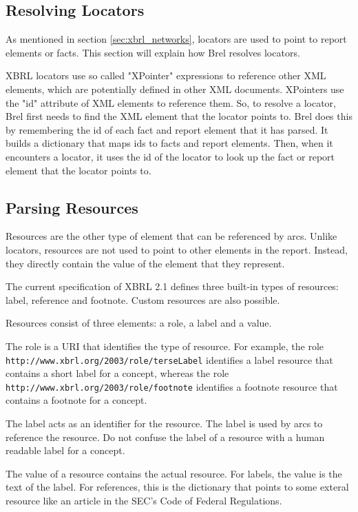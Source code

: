 \subsection{Resolving Locators}

As mentioned in section \ref{sec:xbrl_networks}, locators are used to point to report elements or facts.
This section will explain how Brel resolves locators.

XBRL locators use so called "XPointer" expressions to reference other XML elements, which are potentially defined in other XML documents.\cite{w3_xpointer}
XPointers use the "id" attribute of XML elements to reference them.
So, to resolve a locator, Brel first needs to find the XML element that the locator points to.
Brel does this by remembering the id of each fact and report element that it has parsed.
It builds a dictionary that maps ids to facts and report elements.
Then, when it encounters a locator, it uses the id of the locator to look up the fact or report element that the locator points to.

\subsection{Parsing Resources}

Resources are the other type of element that can be referenced by arcs.
Unlike locators, resources are not used to point to other elements in the report.
Instead, they directly contain the value of the element that they represent.

The current specification of XBRL 2.1 defines three built-in types of resources: label, reference and footnote.
Custom resources are also possible.

Resources consist of three elements: a role, a label and a value.

The role is a URI that identifies the type of resource.
For example, the role \texttt{http://www.xbrl.org/2003/role/terseLabel} identifies a label resource that contains a short label for a concept, 
whereas the role \texttt{http://www.xbrl.org/2003/role/footnote} identifies a footnote resource that contains a footnote for a concept.

The label acts as an identifier for the resource.
The label is used by arcs to reference the resource.
Do not confuse the label of a resource with a human readable label for a concept.

The value of a resource contains the actual resource.
For labels, the value is the text of the label.
For references, this is the dictionary that points to some exteral resource like an article in the SEC's Code of Federal Regulations.

